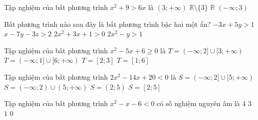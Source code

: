 

\begin{ex}%
	Tập nghiệm của bất phương trình  $x^2+9> 6x$ là
	 \choice
		 {$(3;+\infty)$}
		{\True $\mathbb{R}  \setminus\{3\}$}
		{$\mathbb{R}$} 
		{$(-\infty; 3)$} 
\end{ex}

\begin{ex}%
	Bất phương trình nào sau đây là bất phương  trình bậc hai một ẩn?
	\choice 
		{ $-3x+5y>1$} 
		{$x-7y-3z>2$} 
		{\True$2x^2+3x+1>0$} 
		{$2x^2-y>1$} 
\end{ex}

\begin{ex}%
	Tập  nghiệm của bất phương trình $x^2-5x+6\geq 0$ là
	\choice 
		 {\True $T=(-\infty;2]\cup[3;+\infty)$}
		{$T=(-\infty;1]\cup[6;+\infty)$} 
		 {$T=[2;3]$}
		{$T=[1;6]$} 
	 \loigiai{
		Bất phương trình $x^2-5x+6\geq 0$ có  tập nghiệm là $T=(-\infty;2]\cup[3;+\infty)$.
	 }
\end{ex}

\begin{ex}%
	Tập nghiệm của bất phương  trình $2x^2-14x+20<0$ là
	 \choice
		{$S=(-\infty; 2] \cup  [5;+\infty)$}
		{$S=(-\infty; 2) \cup  (5;+\infty)$}
		{\True $S=(2; 5)$} 
		{$S=[2;  5]$}
\end{ex}

\begin{ex}%
	Tập nghiệm của bất phương trình $x^2-x-6<  0$ có số nghiệm nguyên âm là
	 \choice
		 {$4$}
		 {$3$}
		{\True $1$} 
		 {$0$}
\end{ex}

